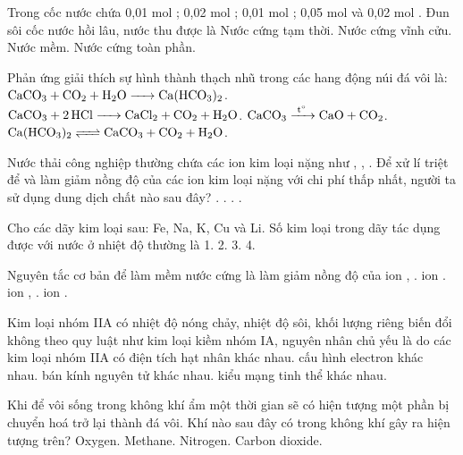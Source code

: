 \documentclass[11pt,a4paper]{article}
\def\loigiai#1{}
\begin{document}
\begin{ex}
Trong cốc nước chứa 0,01 mol ; 0,02 mol ; 0,01 mol ; 0,05 mol  và 0,02 mol . Đun sôi cốc nước hồi lâu, nước thu được là
\choice
{Nước cứng tạm thời.}
{Nước cứng vĩnh cửu.}
{Nước mềm.}
{Nước cứng toàn phần.}
\loigiai{}
\end{ex}

\begin{ex}
Phản ứng giải thích sự hình thành thạch nhũ trong các hang động núi đá vôi là:
\choice
{$\ce{CaCO3 + CO2 + H2O -> Ca(HCO3)2}$.}
{$\ce{CaCO3 + 2HCl -> CaCl2 + CO2 + H2O}$.}
{$\ce{CaCO3 ->[t^\circ] CaO + CO2}$.}
{$\ce{Ca(HCO3)2 <=> CaCO3 + CO2 + H2O}$.}
\loigiai{}
\end{ex}

\begin{ex}
Nước thải công nghiệp thường chứa các ion kim loại nặng như , , . Để xử lí triệt để và làm giảm nồng độ của các ion kim loại nặng với chi phí thấp nhất, người ta sử dụng dung dịch chất nào sau đây?
\choice
{.}
{.}
{.}
{.}
\loigiai{}
\end{ex}

\begin{ex}
Cho các dãy kim loại sau: Fe, Na, K, Cu và Li. Số kim loại trong dãy tác dụng được với nước ở nhiệt độ thường là
\choice
{1.}
{2.}
{3.}
{4.}
\loigiai{}
\end{ex}

\begin{ex}
Nguyên tắc cơ bản để làm mềm nước cứng là làm giảm nồng độ của
\choice
{ion , .}
{ion .}
{ion , .}
{ion .}
\loigiai{}
\end{ex}

\begin{ex}
Kim loại nhóm IIA có nhiệt độ nóng chảy, nhiệt độ sôi, khối lượng riêng biến đổi không theo quy luật như kim loại kiềm nhóm IA, nguyên nhân chủ yếu là do các kim loại nhóm IIA có
\choice
{điện tích hạt nhân khác nhau.}
{cấu hình electron khác nhau.}
{bán kính nguyên tử khác nhau.}
{kiểu mạng tinh thể khác nhau.}
\loigiai{}
\end{ex}

\newpage

\begin{ex}
Khi để vôi sống trong không khí ẩm một thời gian sẽ có hiện tượng một phần bị chuyển hoá trở lại thành đá vôi. Khí nào sau đây có trong không khí gây ra hiện tượng trên?
\choice
{Oxygen.}
{Methane.}
{Nitrogen.}
{Carbon dioxide.}
\loigiai{}
\end{ex}
\end{document}
